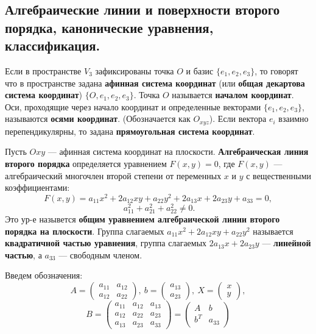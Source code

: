 \subsection{Алгебраические линии и поверхности второго порядка, канонические уравнения,  классификация.}

Если в пространстве $V_3$ зафиксированы точка $O$ и базис $\{e_1, e_2, e_3\}$, то говорят что в пространстве задана \textbf{афинная система координат} (или \textbf{общая декартова система координат}) $\{O, e_1, e_2, e_3\}$. Точка $O$ называется \textbf{началом координат}. Оси, проходящие через начало координат и определенные векторами $\{e_1, e_2, e_3\}$, называются \textbf{осями координат}. (Обозначается как $O_{xyz}$). Если вектора $e_i$ взаимно перепендикулярны, то задана \textbf{прямоугольная система координат}.

\bigbreak

Пусть $Oxy$ --- афинная система координат на плоскости. \textbf{Алгебраическая линия второго порядка} определяется уравнением $F(x, y) = 0$, где $F(x, y)$ --- алгебраический многочлен второй степени от переменных $x$ и $y$ с вещественными коэффициентами:
$$F(x,y)=a_{11}x^2 +2a_{12}xy+a_{22}y^2 +2a_{13}x+2a_{23}y+a_{33} =0,$$
$$~a_{11}^2 + a_{21}^2 + a_{22}^2\neq 0.$$
Это ур-е назывется \textbf{общим уравнением алгебраической линии второго порядка на плоскости}. Группа слагаемых $a_{11}x^2 + 2a_{12}xy + a_{22}y^2$ называется \textbf{квадратичной частью уравнения}, группа слагаемых $2a_{13}x + 2a_{23}y$ --- \textbf{линейной частью}, а $a_{33}$ --- свободным членом.

Введем обозначения:
$$A = \begin{pmatrix} a_{11} & a_{12} \\a_{12} & a_{22}\end{pmatrix},~ b=\begin{pmatrix} a_{13} \\ a_{23} \end{pmatrix},~ X=\begin{pmatrix}x \\ y\end{pmatrix},$$
$$B = \begin{pmatrix} a_{11} & a_{12} & a_{13} \\a_{12} & a_{22} & a_{23} \\ a_{13} & a_{23} & a_{33}\end{pmatrix} = \begin{pmatrix} A & b \\ b^T & a_{33}\end{pmatrix}$$

